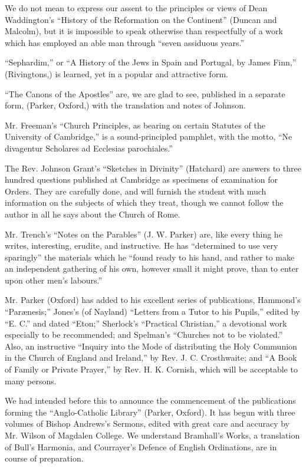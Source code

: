 We do not mean to express our assent to the
principles or views of Dean Waddington's ``History of the Reformation on
the Continent'' (Duncan and Malcolm), but it is impossible to speak
otherwise than respectfully of a work which has employed an able man
through ``seven assiduous years.''

``Sephardim,'' or ``A History of the Jews in Spain and
Portugal, by James Finn,'' (Rivingtons,) is learned, yet in a popular and
attractive form.

``The Canons of the Apostles'' are, we are glad to
see, published in a separate form, (Parker, Oxford,) with the
translation and notes of Johnson.

Mr. Freeman's ``Church Principles, as bearing on
certain Statutes of the University of Cambridge,'' is a sound-principled
pamphlet, with the motto, ``Ne divagentur Scholares ad Ecclesias
parochiales.''

The Rev. Johnson Grant's ``Sketches in Divinity'' (Hatchard)
are answers to three hundred questions published at Cambridge as
specimens of examination for Orders. They are carefully done, and will
furnish the student with much information on the subjects of which they
treat, though we cannot follow the author in all he says about the
Church of Rome.

Mr. Trench's ``Notes on the Parables'' (J. W. Parker)
are, like every thing he writes, interesting, erudite, and instructive.
He has ``determined to use very sparingly'' the materials which he ``found
ready to his hand, and rather to make an independent gathering of his
own, however small it might prove, than to enter upon other men's
labours.''

Mr. Parker (Oxford) has added to his excellent
series of publications, Hammond's ``Parænesis;'' Jones's (of Nayland) ``Letters
from a Tutor to his Pupils,'' edited by ``E. C.'' and dated ``Eton;''
Sherlock's ``Practical Christian,'' a devotional work especially to be
recommended; and Spelman's ``Churches not to be violated.'' Also, an
instructive ``Inquiry into the Mode of distributing the Holy Communion in
the Church of England and Ireland,'' by Rev. J. C. Crosthwaite; and ``A
Book of Family or Private Prayer,'' by Rev. H. K. Cornish, which will be
acceptable to many persons.

We had intended before this to announce the
commencement of the publications forming the ``Anglo-Catholic Library''
(Parker, Oxford). It has begun with three volumes of Bishop
Andrews's Sermons, edited with great care and accuracy by Mr. Wilson of
Magdalen College. We understand Bramhall's Works, a translation of Bull's
Harmonia, and Courrayer's Defence of English Ordinations, are in course
of preparation.

